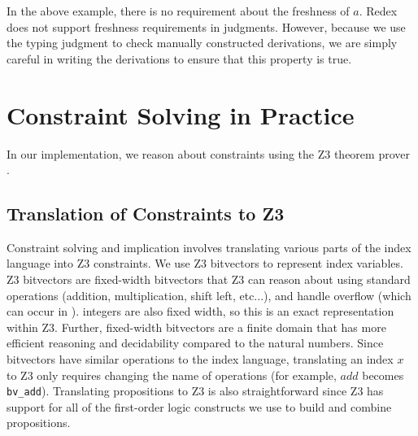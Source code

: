 In the above example, there is no requirement about the freshness of $a$.
Redex does not support freshness requirements in judgments.
However, because we use the typing judgment to check manually constructed derivations, we are simply careful in writing the derivations to ensure that this property is true.

\section{Constraint Solving in Practice}
In our implementation, we reason about constraints using the Z3 theorem prover \cite{z3}.

\subsection{Translation of Constraints to Z3}
\label{subsec:z3}
Constraint solving and implication involves translating various parts of the \name index language into Z3 constraints.
We use Z3 bitvectors to represent index variables.
Z3 bitvectors are fixed-width bitvectors that Z3 can reason about using standard operations (addition, multiplication, shift left, etc...), and handle overflow (which can occur in \wasm).
\name integers are also fixed width, so this is an exact representation within Z3.
Further, fixed-width bitvectors are a finite domain that has more efficient reasoning and decidability compared to the natural numbers.
Since bitvectors have similar operations to the \name index language, translating an index $x$ to Z3 only requires changing the name of operations (for example, $add$ becomes \texttt{bv_add}).
Translating propositions to Z3 is also straightforward since Z3 has support for all of the first-order logic constructs we use to build and combine propositions.

